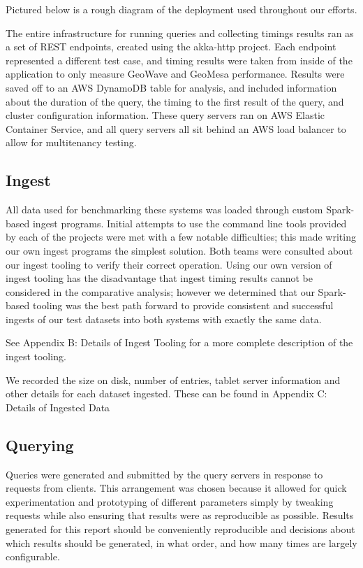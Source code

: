 Pictured below is a rough diagram of the deployment used throughout our efforts.

The entire infrastructure for running queries and collecting timings results ran as a set of REST endpoints, created using the akka-http project.
Each endpoint represented a different test case, and timing results were taken from inside of the application to only measure GeoWave and GeoMesa performance.
Results were saved off to an AWS DynamoDB table for analysis, and included information about the duration of the query, the timing to the first result of the query, and cluster configuration information.
These query servers ran on AWS Elastic Container Service, and all query servers all sit behind an AWS load balancer to allow for multitenancy testing.


\subsection{Ingest}
\label{sec:performance:ingest}

All data used for benchmarking these systems was loaded through custom Spark-based ingest programs.
Initial attempts to use the command line tools provided by each of the projects were met with a few notable difficulties; this made writing our own ingest programs the simplest solution.
Both teams were consulted about our ingest tooling to verify their correct operation.
Using our own version of ingest tooling has the disadvantage that ingest timing results cannot be considered in the comparative analysis; however we determined that our Spark-based tooling was the best path forward to provide consistent and successful ingests of our test datasets into both systems with exactly the same data.

See Appendix B: Details of Ingest Tooling for a more complete description of the ingest tooling.

We recorded the size on disk, number of entries, tablet server information and other details for each dataset ingested.
These can be found in Appendix C: Details of Ingested Data


\subsection{Querying}
\label{sec:performance:querying}

Queries were generated and submitted by the query servers in response to requests from clients.
This arrangement was chosen because it allowed for quick experimentation and prototyping of different parameters simply by tweaking requests while also ensuring that results were as reproducible as possible. Results generated for this report should be conveniently reproducible and decisions about which results should be generated, in what order, and how many times are largely configurable.


